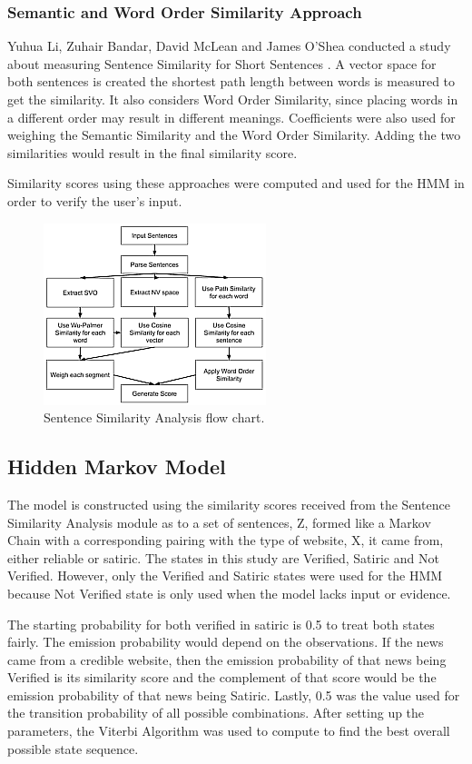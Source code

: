 \documentclass[journal]{./IEEEtran}
\begin{document}
	\subsubsection{Semantic and Word Order Similarity Approach}
	Yuhua Li, Zuhair Bandar, David McLean and James O’Shea conducted a study about measuring Sentence Similarity for Short Sentences \cite{lee}. A vector space for both sentences is created the shortest path length between words is measured to get the similarity. It also considers Word Order Similarity, since placing words in a different order may result in different meanings. Coefficients were also used for weighing the Semantic Similarity and the Word Order Similarity. Adding the two similarities would result in the final similarity score.
	
	Similarity scores using these approaches were computed and used for the HMM in order to verify the user's input.
	
	\begin{figure}
		\includegraphics{ssa}
		\caption{Sentence Similarity Analysis flow chart.}
		\label{ssa}
	\end{figure}
	
	\subsection{Hidden Markov Model}
	The model is constructed using the similarity scores received from the Sentence Similarity Analysis module as to a set of sentences, Z, formed like a Markov Chain with a corresponding pairing with the type of website, X, it came from, either reliable or satiric. The states in this study are Verified, Satiric and Not Verified. However, only the Verified and Satiric states were used for the HMM because Not Verified state is only used when the model lacks input or evidence.
	
	The starting probability for both verified in satiric is 0.5 to treat both states fairly. The emission probability would depend on the observations. If the news came from a credible website, then the emission probability of that news being Verified is its similarity score and the complement of that score would be the emission probability of that news being Satiric. Lastly, 0.5 was the value used for the transition probability of all possible combinations. After setting up the parameters, the Viterbi Algorithm was used to compute to find the best overall possible state sequence.
	
\end{document}
